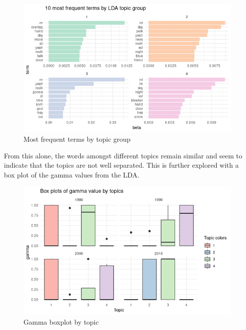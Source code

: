 \documentclass[
  authoryear,
  preprint]{elsarticle}
\begin{document}
\begin{figure}[H]

{\centering \includegraphics{images/freqLDA.png}

}

\caption{Most frequent terms by topic group}

\end{figure}%

From this alone, the words amongst different topics remain similar and
seem to indicate that the topics are not well separated. This is further
explored with a box plot of the gamma values from the LDA.

\begin{figure}[H]

{\centering \includegraphics{images/boxplottopic.png}

}

\caption{Gamma boxplot by topic}

\end{figure}%
\end{document}
